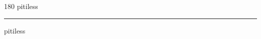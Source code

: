 
\begin{frame}
\begin{center}
\begin{turn}{180}
{\fontsize{2.5cm}{1em}\selectfont pitiless}
\end{turn}
\vspace{1em}\par  
\hrule
\vspace{1em}\par  
{\fontsize{2.5cm}{1em}\selectfont pitiless}
\end{center}
\end{frame}
